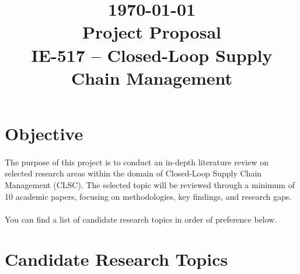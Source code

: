 \documentclass[12pt]{article}
\title{
    \hfill \normalsize\today \\
    \textbf{\Large Project Proposal}\\[0.5em]
    \large IE-517 -- Closed-Loop Supply Chain Management}
\author{\normalsize\fbox{
        \begin{tabular}{c@{\hspace{1cm}}c}
            Emek Irmak & Furkan Ertürk \\
            2444693 & 2740215 \\
        \end{tabular}
    }
        \date{}
}
\begin{document}
\maketitle
\onehalfspacing

\section*{Objective}
\paragraph{} The purpose of this project is to conduct an in-depth literature review on selected research areas within the domain of Closed-Loop Supply Chain Management (CLSC).  The selected topic will be reviewed through a minimum of 10 academic papers, focusing on methodologies, key findings, and research gaps.

\paragraph{} You can find a list of candidate research topics in order of preference below.

\section*{Candidate Research Topics}
\end{document}

